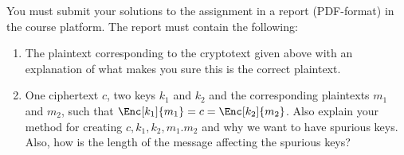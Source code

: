 \documentclass[a4paper]{llncs}
\begin{document}
You must submit your solutions to the assignment in a report (PDF-format) in 
the course platform.
The report must contain the following:
\begin{enumerate}
  \item The plaintext corresponding to the cryptotext given above with an 
    explanation of what makes you sure this is the correct plaintext.


  \item One ciphertext \(c\), two keys \(k_1\) and \(k_2\) and the 
    corresponding plaintexts \(m_1\) and \(m_2\), such that \(\Enc[k_1]{m_1} 
      = c = \Enc[k_2]{m_2}\).
    Also explain your method for creating \(c, k_1, k_2, m_1. m_2\) and why we 
    want to have spurious keys.
    Also, how is the length of the message affecting the spurious keys?

\end{enumerate}


\printbibliography{}
\end{document}

